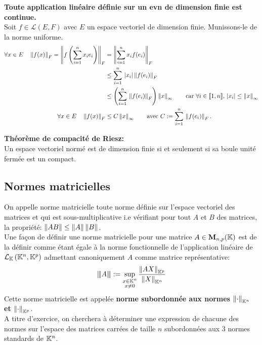 \documentclass[12pt,a4paper]{article}
\begin{document}
	\textbf{Toute application linéaire définie sur un evn de dimension finie est continue.}\\
	Soit $f\in \mathcal{L}(E,F)$ avec $E$ un espace vectoriel de dimension finie. Munissons-le de la norme uniforme.\\
	\begin{align*}
		\forall x\in E \quad  \norm{f(x)}_F = \norm{f\left(\somme{i=1}{n} x_i e_i\right)}_F&=\norm{\somme{i=1}{n} x_i f(e_i)}_F\\
		&\leq \somme{i=1}{n} \abs{x_i}\norm{f(e_i)}_F\\
		&\leq \left(\somme{i=1}{n} \norm{f(e_i)}_F\right) \norm{x}_{\infty}\qquad \text{car } \forall i\in\llbracket 1, n \rrbracket, \, \abs{x_i}\leq \norm{x}_{\infty} \\
		\forall x\in E \quad  \norm{f(x)}_F &\leq C\norm{x}_{\infty} \qquad \text{avec } C:=\somme{i=1}{n} \norm{f(e_i)}_F.										
	\end{align*}	
	
	\textbf{Théorème de compacité de Riesz:}\\
	Un espace vectoriel normé est de dimension finie si et seulement si sa boule unité fermée est un compact.
	\subsection*{Normes matricielles}
	On appelle norme matricielle toute norme définie sur l'espace vectoriel des matrices et qui est sous-multiplicative i.e vérifiant pour tout $A$ et $B$ des matrices, la propriété: $\norm{AB}\leq \norm{A} \norm{B}$.\\
	Une façon de définir une norme matricielle pour une matrice $A\in \mathbf{M}_{n,p}(\ens{K}) $ est de la définir comme étant égale à la norme fonctionnelle de l'application linéaire de $\mathcal{L}_{\ens{K}} \left(\ens{K}^n,\ens{K}^p \right) $ admettant canoniquement $A$ comme matrice représentative:
	\[\fonctnorm{A}:=\sup_{\substack{x\in \ens{K}^n \\ x\neq 0}}\frac{\norm{AX}_{\ens{K}^p}}{\norm{X}_{\ens{K}^n}} \]
	Cette norme matricielle est appelée \textbf{norme subordonnée aux normes $\norm{\cdot}_{\ens{K}^n}$ et $\norm{\cdot}_{\ens{K}^p}$}.\\
	A titre d'exercice, on cherchera à déterminer une expression de chacune des normes sur l'espace des matrices carrées de taille $n$ subordonnées aux 3 normes standards de $\ens{K}^n$.\\
	
\end{document}
